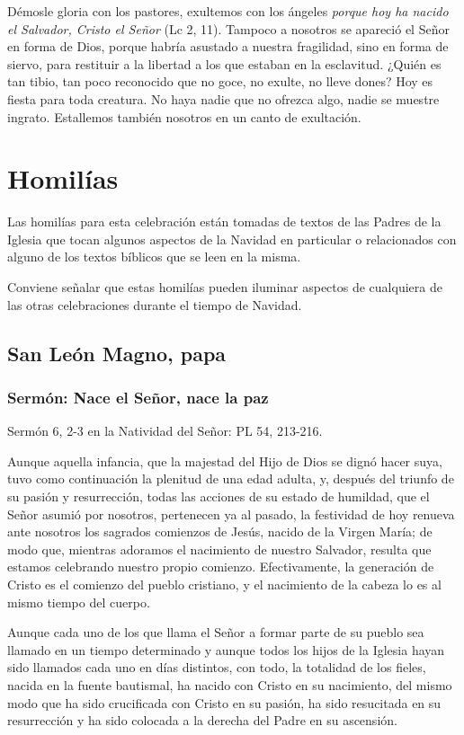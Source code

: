 Démosle gloria con los pastores, exultemos con los ángeles \emph{porque hoy ha nacido el Salvador, Cristo el Señor} (Lc 2, 11). Tampoco a nosotros se apareció el Señor en forma de Dios, porque habría asustado a nuestra fragilidad, sino en forma de siervo, para restituir a la libertad a los que estaban en la esclavitud. ¿Quién es tan tibio, tan poco reconocido que no goce, no exulte, no lleve dones? Hoy es fiesta para toda creatura. No haya nadie que no ofrezca algo, nadie se muestre ingrato. Estallemos también nosotros en un canto de exultación.

\section{Homilías}

Las homilías para esta celebración están tomadas de textos de las Padres de la Iglesia que tocan algunos aspectos de la Navidad en particular o relacionados con alguno de los textos bíblicos que se leen en la misma.

Conviene señalar que estas homilías pueden iluminar aspectos de cualquiera de las otras celebraciones durante el tiempo de Navidad.

\subsection{San León Magno, papa}

\subsubsection{Sermón: Nace el Señor, nace la paz}

Sermón 6, 2-3 en la Natividad del Señor: PL 54, 213-216.

Aunque aquella infancia, que la majestad del Hijo de Dios se dignó hacer suya, tuvo como continuación la plenitud de una edad adulta, y, después del triunfo de su pasión y resurrección, todas las acciones de su estado de humildad, que el Señor asumió por nosotros, pertenecen ya al pasado, la festividad de hoy renueva ante nosotros los sagrados comienzos de Jesús, nacido de la Virgen María; de modo que, mientras adoramos el nacimiento de nuestro Salvador, resulta que estamos celebrando nuestro propio comienzo. Efectivamente, la generación de Cristo es el comienzo del pueblo cristiano, y el nacimiento de la cabeza lo es al mismo tiempo del cuerpo.

Aunque cada uno de los que llama el Señor a formar parte de su pueblo sea llamado en un tiempo determinado y aunque todos los hijos de la Iglesia hayan sido llamados cada uno en días distintos, con todo, la totalidad de los fieles, nacida en la fuente bautismal, ha nacido con Cristo en su nacimiento, del mismo modo que ha sido crucificada con Cristo en su pasión, ha sido resucitada en su resurrección y ha sido colocada a la derecha del Padre en su ascensión.

